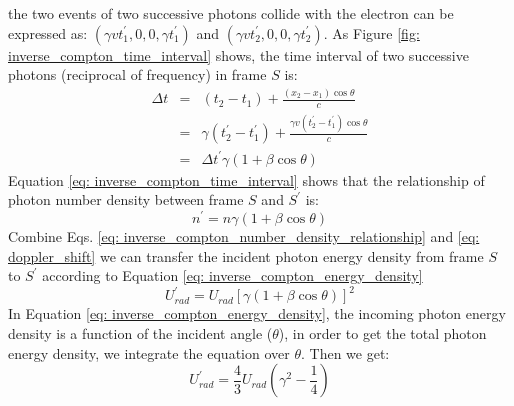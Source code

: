 \documentclass[12pt]{report}
\begin{document}
            the two events of two successive photons collide with the electron can be 
            expressed as:
            $\left(\gamma v t_{1}^{\prime}, 0, 0, \gamma t_{1}^{\prime}\right)$ and 
            $\left(\gamma v t_{2}^{\prime}, 0, 0, \gamma t_{2}^{\prime}\right)$. 
            As Figure \ref{fig: inverse_compton_time_interval} shows, the time interval of two 
            successive photons (reciprocal of frequency) in frame $S$ is: 
            \begin{eqnarray}
              \label{eq: inverse_compton_time_interval}
              \Delta t &=& \left(t_2 - t_1\right) + \frac{\left(x_2 - x_1\right) \cos{\theta}}{c}  \nonumber \\
                      &=& \gamma \left(t_{2}^{\prime} - t_{1}^{\prime}\right) + \frac{\gamma v \left(t_{2}^{\prime} - t_{1}^{\prime}\right) \cos{\theta}}{c} \nonumber \\
                      &=&  \Delta t^{\prime} \gamma \left(1 + \beta \cos{\theta}\right) 
            \end{eqnarray}
            Equation \ref{eq: inverse_compton_time_interval} shows that the relationship of photon 
            number density between frame $S$ and $S^{\prime}$ is:
            \begin{equation}
              \label{eq: inverse_compton_number_density_relationship}
              n^{\prime} = n \gamma \left(1 + \beta \cos{\theta}\right) 
            \end{equation}
            Combine Eqs. \ref{eq: inverse_compton_number_density_relationship} and 
            \ref{eq: doppler_shift} we can transfer the incident photon energy density from 
            frame $S$ to $S^{\prime}$ according to Equation \ref{eq: inverse_compton_energy_density}
            \begin{equation}
              \label{eq: inverse_compton_energy_density}
              U_{rad}^{\prime} = U_{rad} \left[\gamma \left(1 + \beta \cos{\theta}\right)\right]^{2}
            \end{equation}
            In Equation \ref{eq: inverse_compton_energy_density}, the incoming photon energy density 
            is a function of the incident angle ($\theta$), in order to get the total photon 
            energy density, we integrate the equation over $\theta$. Then we get: 
            \begin{equation}
              \label{eq: inverse_compton_energy_density_total}
              U_{rad}^{\prime} = \frac{4}{3} U_{rad} \left(\gamma^2 - \frac{1}{4}\right)
            \end{equation}
\end{document}
